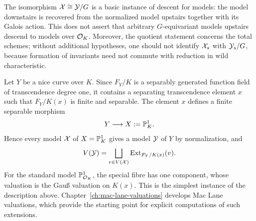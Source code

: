 \begin{remark}\label{rem:galois-quotient-descent}
    The isomorphism $\mathcal X\cong\mathcal Y/G$ is a basic instance of descent for models: the model downstairs is recovered from the normalized model upstairs together with its Galois action.
    This does not assert that arbitrary $G$-equivariant models upstairs descend to models over $\mathcal O_K$.
    Moreover, the quotient statement concerns the total schemes; without additional hypotheses, one should not identify $\mathcal X_s$ with $\mathcal Y_s/G$, because formation of invariants need not commute with reduction in wild characteristic.
\end{remark}

\begin{example}\label{ex:normalization-cover-projective-line}
    Let $Y$ be a nice curve over $K$.
    Since $F_Y/K$ is a separably generated function field of transcendence degree one, it contains a separating transcendence element $x$ such that $F_Y/K(x)$ is finite and separable.
    The element $x$ defines a finite separable morphism
    \[
        Y\longrightarrow X:=\mathbb P^1_K.
    \]
    Hence every model $\mathcal X$ of $X=\mathbb P^1_K$ gives a model $\mathcal Y$ of $Y$ by normalization, and
    \[
        V(\mathcal Y)
        =
        \bigsqcup_{v\in V(\mathcal X)}
        \operatorname{Ext}_{F_Y/K(x)}(v).
    \]
    For the standard model $\mathbb P^1_{\mathcal O_K}$, the special fibre has one component, whose valuation is the Gauß valuation on $K(x)$.
    This is the simplest instance of the description above.
    Chapter~\ref{ch:mac-lane-valuations} develops Mac Lane valuations, which provide the starting point for explicit computations of such extensions.
\end{example}

